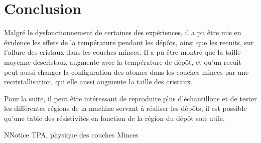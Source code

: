 \documentclass[a4paper,12pt,oneside]{article}
\begin{document}












\newpage
\section{Conclusion}

Malgré le dysfonctionnement de certaines des expériences, il a pu être mis en évidence les effets de la température pendant les dépôts, ainsi que les recuits, sur l'allure des cristaux dans les couches minces. Il a pu être montré que la taille moyenne descristaux augmente avec la température de dépôt, et qu'un recuit peut aussi changer la configuration des atomes dans les couches minces par une recristallisation, qui elle aussi augmente la taille des cristaux.

Pour la suite, il peut être intéressant de reproduire plus d'échantillons et de tester les différentes régions de la machine servant à réaliser les dépôts, il est possible qu'une table des résistivités en fonction de la région du dépôt soit utile.






\begin{thebibliography}{99}
\bibitem
NNotice TPA, physique des couches Minces
\end{thebibliography}
\end{document}
